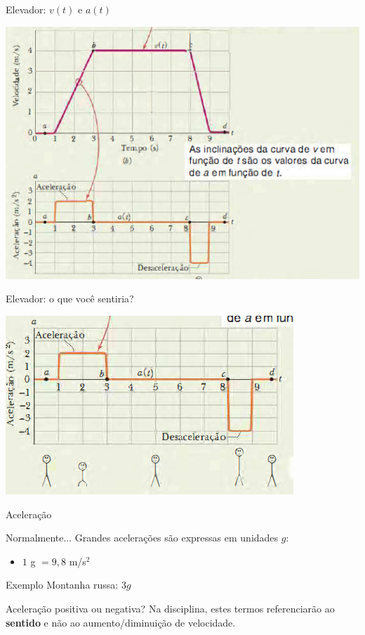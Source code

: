 \documentclass[xcolor=dvipsnames,table]{beamer}
\begin{document}
	\begin{frame}{Elevador: $v(t)$ e $a(t)$}
		\begin{center}
			\includegraphics[scale=0.6]{images/fig2-6bc}
		\end{center}
	\end{frame}

	\begin{frame}{Elevador: o que você sentiria?}
		\begin{center}
			\includegraphics[scale=0.6]{images/fig2-6d}
		\end{center}
	\end{frame}

	\begin{frame}{Aceleração}
		\begin{block}{Normalmente...}
			Grandes acelerações são expressas em unidades $g$:
			\begin{itemize}
				\item $1$ g $= 9,8$ m/s$^2$
			\end{itemize}
		\end{block} 
		\begin{block}{Exemplo}
			Montanha russa: $3g$
		\end{block}
		\begin{block}{Aceleração positiva ou negativa?}
			Na disciplina, estes termos referenciarão ao {\bf sentido} e não ao aumento/diminuição de velocidade.
		\end{block}
	\end{frame}
\end{document}
